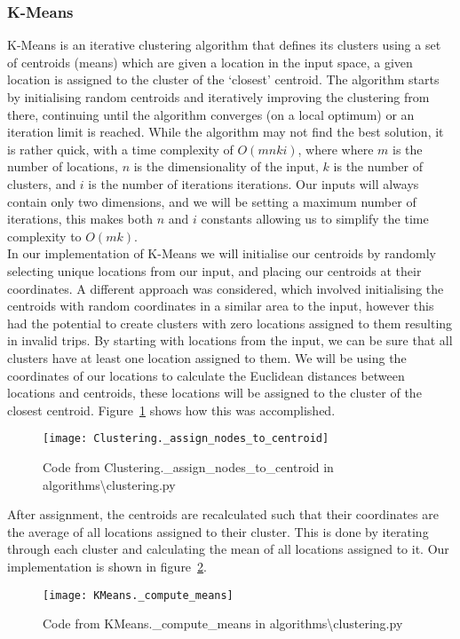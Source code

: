 \subsubsection{K-Means}\label{subsubsec:k-means}
K-Means is an iterative clustering algorithm that defines its clusters using a set of centroids (means) which are
given a location in the input space, a given location is assigned to the cluster of the `closest' centroid.
The algorithm starts by initialising random centroids and iteratively improving the clustering from there, continuing
until the algorithm converges (on a local optimum) or an iteration limit is reached.
While the algorithm may not find the best solution, it is rather quick, with a time complexity of $O(mnki)$,
where where $m$ is the number of locations, $n$ is the dimensionality of the input, $k$ is the number of clusters,
and $i$ is the number of iterations iterations.
Our inputs will always contain only two dimensions, and we will be setting a maximum number of iterations, this
makes both $n$ and $i$ constants allowing us to simplify the time complexity to $O(mk)$.\\

\noindent
In our implementation of K-Means we will initialise our centroids by randomly selecting unique locations from our
input, and placing our centroids at their coordinates.
A different approach was considered, which involved initialising the centroids with random coordinates in a similar
area to the input, however this had the potential to create clusters with zero locations assigned to them resulting
in invalid trips.
By starting with locations from the input, we can be sure that all clusters have at least one location assigned to them.
We will be using the coordinates of our locations to calculate the Euclidean distances between locations and centroids,
these locations will be assigned to the cluster of the closest centroid.
Figure~\ref{fig:Clustering._assign_nodes_to_centroid} shows how this was accomplished.
\begin{figure}[H]
    \centering
    \texttt{[image: Clustering.\_assign\_nodes\_to\_centroid]}
    \caption{Code from Clustering.\_assign\_nodes\_to\_centroid in algorithms\textbackslash clustering.py}\label{fig:Clustering._assign_nodes_to_centroid}
\end{figure}

\noindent
After assignment, the centroids are recalculated such that their coordinates are the average of all locations
assigned to their cluster.
This is done by iterating through each cluster and calculating the mean of all locations assigned to it.
Our implementation is shown in figure~\ref{fig:KMeans._compute_means}.
\begin{figure}[H]
    \centering
    \texttt{[image: KMeans.\_compute\_means]}
    \caption{Code from KMeans.\_compute\_means in algorithms\textbackslash clustering.py}\label{fig:KMeans._compute_means}
\end{figure}

